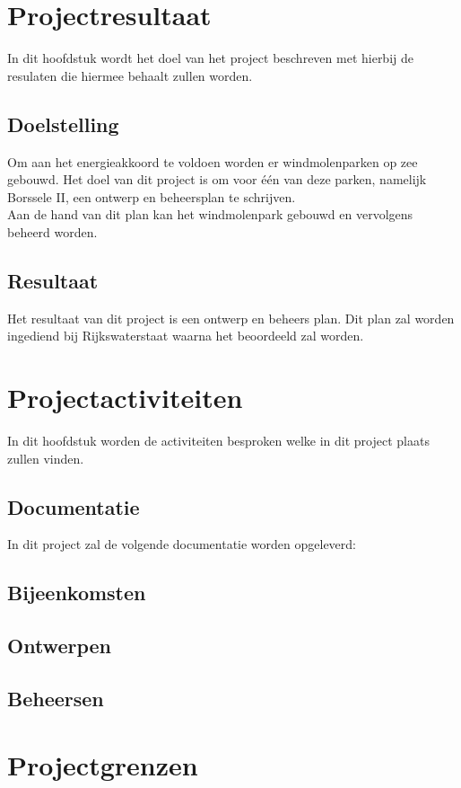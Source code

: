 \documentclass[numbers=endperiod]{scrartcl}
\newcommand{\whitespace}{\vspace*{2 mm} \\}%
\begin{document}
	\section{Projectresultaat}
	In dit hoofdstuk wordt het doel van het project beschreven met hierbij de resulaten die hiermee behaalt zullen worden.
	
	\subsection{Doelstelling}
	Om aan het energieakkoord te voldoen worden er windmolenparken op zee gebouwd. Het doel van dit project is om voor één van deze parken, namelijk Borssele II, een ontwerp en beheersplan te schrijven.
	\whitespace
	Aan de hand van dit plan kan het windmolenpark gebouwd en vervolgens beheerd worden.
	
	\subsection{Resultaat}	
	Het resultaat van dit project is een ontwerp en beheers plan. Dit plan zal worden ingediend bij Rijkswaterstaat waarna het beoordeeld zal worden.

	\section{Projectactiviteiten}
	In dit hoofdstuk worden de activiteiten besproken welke in dit project plaats zullen vinden.
	\subsection{Documentatie}
	In dit project zal de volgende documentatie worden opgeleverd:
	\subsection{Bijeenkomsten}
		
	\subsection{Ontwerpen}
	
	\subsection{Beheersen}
				
	\newpage
	
	\section{Projectgrenzen}
	\newpage
\end{document}
